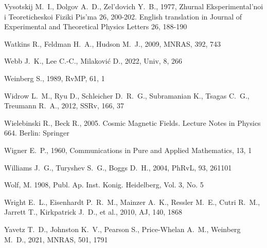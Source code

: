 \documentclass[fleqn,usenatbib]{mnras}
\begin{document}
\begin{thebibliography}{}
 Vysotskij M.~I., Dolgov A.~D., Zel'dovich Y.~B., 1977,  Zhurnal Eksperimental'noi i Teoreticheskoi Fiziki Pis'ma 26, 200-202. English translation in Journal of Experimental and Theoretical Physics Letters 26, 188-190 %

 Watkins R., Feldman H.~A., Hudson M.~J., 2009, MNRAS, 392, 743 %

 Webb J.~K., Lee C.-C., Milakovi{\'c} D., 2022, Univ, 8, 266

 Weinberg S., 1989, RvMP, 61, 1

 Widrow L.~M., Ryu D., Schleicher D.~R.~G., Subramanian K., Tsagas C.~G., Treumann R.~A., 2012, SSRv, 166, 37

 Wielebinski R., Beck R., 2005. Cosmic Magnetic Fields.  Lecture Notes in Physics 664. Berlin: Springer

 Wigner E.~P., 1960, Communications in Pure and  Applied Mathematics, 13, 1


 Williams J.~G., Turyshev S.~G., Boggs D.~H., 2004, PhRvL, 93, 261101

Wolf, M. 1908, Publ. Ap. Inst. Konig. Heidelberg, Vol. 3, No. 5

 Wright E.~L., Eisenhardt P.~R.~M., Mainzer A.~K., Ressler M.~E., Cutri R.~M., Jarrett T., Kirkpatrick J.~D., et al., 2010, AJ, 140, 1868

 Yavetz T.~D., Johnston K.~V., Pearson S., Price-Whelan A.~M., Weinberg M.~D., 2021, MNRAS, 501, 1791



\end{thebibliography}
\end{document}
